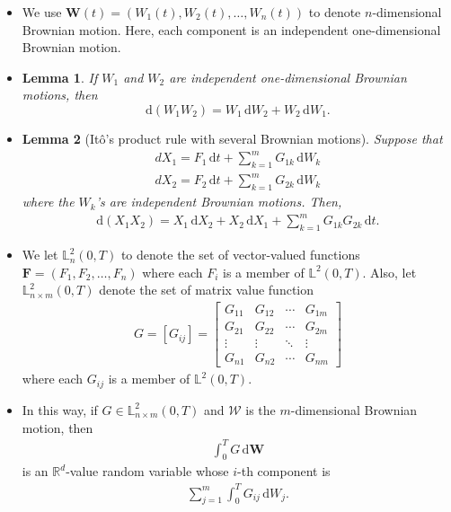 \documentclass[10pt]{article}
\newtheorem{lemma}{Lemma}
\newcommand{\dee}{\mathrm{d}}
\newcommand{\ve}[1]{\mathbf{#1}}
\newcommand{\mcal}[1]{\mathcal{#1}}
\newcommand{\Real}{\mathbb{R}}
\begin{document}
\begin{itemize}
  \item We use $\ve{W}(t) = (W_1(t), W_2(t), \dotsc, W_n(t))$ to denote $n$-dimensional Brownian motion. Here, each component is an independent one-dimensional Brownian motion.
  
  \item \begin{lemma}
    If $W_1$ and $W_2$ are independent one-dimensional Brownian motions, then $$\dee(W_1 W_2) = W_1\, \dee W_2 + W_2\, \dee W_1.$$
  \end{lemma}

  \item \begin{lemma}[It\^{o}'s product rule with several Brownian motions]
    Suppose that
    \begin{align*}
      dX_1 = F_1\, \dee t + \sum_{k=1}^m G_{1k}\, \dee W_k \\
      dX_2 = F_2\, \dee t + \sum_{k=1}^m G_{2k}\, \dee W_k
    \end{align*}
    where the $W_k$'s are independent Brownian motions. Then,
    \begin{align*}
      \dee(X_1 X_2) = X_1\, \dee X_2 + X_2\, \dee X_1 + \sum_{k=1}^m G_{1k}G_{2k}\, \dee t.
    \end{align*}
  \end{lemma}

  \item We let $\mathbb{L}^2_{n}(0,T)$ to denote the set of vector-valued functions $\ve{F} = (F_1, F_2, \dotsc, F_n)$ where each $F_i$ is a member of $\mathbb{L}^2(0,T)$. Also, let $\mathbb{L}^2_{n \times m}(0,T)$ denote the set of matrix value function
  \begin{align*}
    G = [G_{ij}] = \begin{bmatrix}
      G_{11} & G_{12} & \cdots & G_{1m} \\
      G_{21} & G_{22} & \cdots & G_{2m} \\
      \vdots & \vdots & \ddots & \vdots \\
      G_{n1} & G_{n2} & \cdots & G_{nm} 
    \end{bmatrix}    
  \end{align*}
  where each $G_{ij}$ is a member of $\mathbb{L}^2(0,T)$.

  \item In this way, if $G \in \mathbb{L}^2_{n\times m}(0,T)$ and $\mcal{W}$ is the $m$-dimensional Brownian motion, then
  \begin{align*}
    \int_0^T G\, \dee\ve{W}
  \end{align*}
  is an $\Real^d$-value random variable whose $i$-th component is
  \begin{align*} 
    \sum_{j=1}^m \int_0^T G_{ij}\, \dee W_j.
  \end{align*}


\end{itemize}
\end{document}
